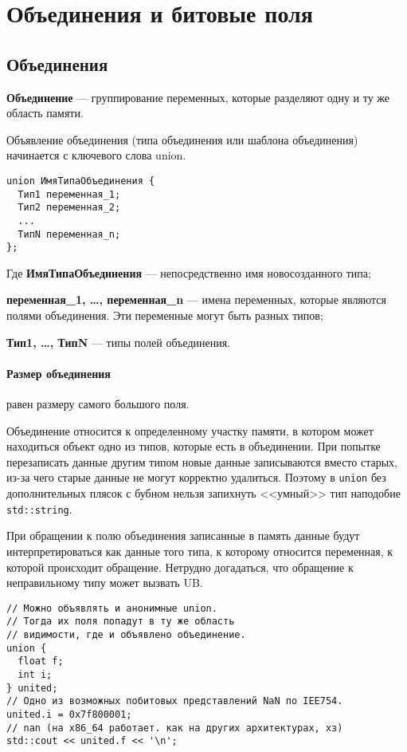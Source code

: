 \documentclass[14pt, a4paper]{extarticle}
\begin{document}
\section{Объединения и битовые поля}
\subsection*{Объединения}
\textbf{Объединение} --- группирование переменных, которые разделяют одну и ту же область памяти.

Объявление объединения (типа объединения или шаблона объединения) начинается с ключевого слова union.

\begin{verbatim}
union ИмяТипаОбъединения {
  Тип1 переменная_1;
  Тип2 переменная_2;
  ...
  ТипN переменная_n;
};
\end{verbatim}

Где
\textbf{ИмяТипаОбъединения} --- непосредственно имя новосозданного типа;

\textbf{переменная\_1, \dots, переменная\_n} --- имена переменных, которые являются полями объединения.
Эти переменные могут быть разных типов;

\textbf{Тип1, \dots, ТипN} --- типы полей объединения.

\paragraph{Размер объединения} равен размеру самого большого поля.

Объединение относится к определенному участку памяти, в котором может находиться объект одно из типов,
которые есть в объединении. При попытке перезаписать данные другим типом новые данные записываются
вместо старых, из-за чего старые данные не могут корректно удалиться. Поэтому в \verb|union| без
дополнительных плясок с бубном нельзя запихнуть <<умный>> тип наподобие \verb|std::string|.

При обращении к полю объединения записанные в память данные будут
интерпретироваться как данные того типа, к которому относится переменная, к которой происходит
обращение. Нетрудно догадаться, что обращение к неправильному типу может вызвать UB.

\begin{verbatim}
// Можно объявлять и анонимные union.
// Тогда их поля попадут в ту же область
// видимости, где и объявлено объединение.
union {
  float f;
  int i;
} united;
// Одно из возможных побитовых представлений NaN по IEE754.
united.i = 0x7f800001;
// nan (на x86_64 работает. как на других архитектурах, хз)
std::cout << united.f << '\n';
\end{verbatim}
\end{document}
